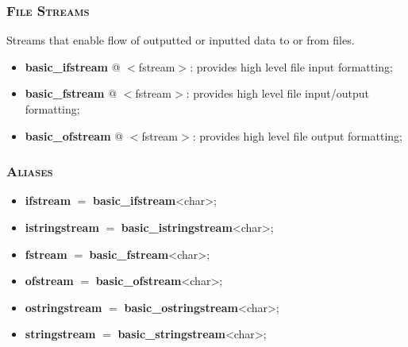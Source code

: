\documentclass[10pt]{article}
\begin{document}
\begin{multicols*}{5}
{\subsubsection*{\textsc{File Streams}} 
\noindent
Streams that enable flow of outputted or inputted data to or from files.

\begin{itemize}[leftmargin=*,topsep=0.25pt]
  \setlength\itemsep{-1.8pt}
	\item \textbf{basic\_ifstream} @ $<$fstream$>$: provides high level file input formatting;
	\item \textbf{basic\_fstream} @ $<$fstream$>$: provides high level file input/output formatting;
	\item \textbf{basic\_ofstream} @ $<$fstream$>$: provides high level file output formatting;
\end{itemize}

\subsubsection*{\textsc{Aliases}} 
\begin{itemize}[leftmargin=*,topsep=0.25pt]
  \setlength\itemsep{-1.8pt}
	\item \textbf{ifstream} $=$ \textbf{basic\_ifstream}<char>;
	\item \textbf{istringstream} $=$ \textbf{basic\_istringstream}<char>;
	\item \textbf{fstream} $=$ \textbf{basic\_fstream}<char>;
	\item \textbf{ofstream} $=$ \textbf{basic\_ofstream}<char>;
	\item \textbf{ostringstream} $=$ \textbf{ba\-sic\_o\-string\-stream}\-<char>;
	\item \textbf{stringstream} $=$ \textbf{basic\_stringstream}<char>;
\end{itemize}


}
\end{multicols*}
\end{document}

